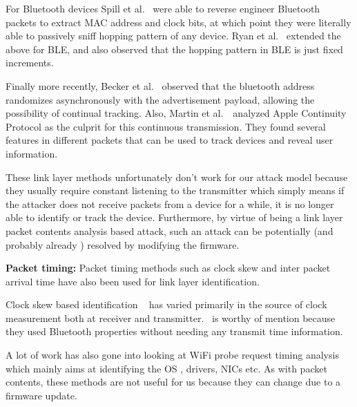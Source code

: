     For Bluetooth devices Spill et al.~\cite{spill2007bluesniff} were able to reverse engineer Bluetooth
    packets to extract MAC address and clock bits, at which point they were literally able to passively sniff hopping pattern of any device.
    Ryan et al.~\cite{ryanble} extended the above for BLE, and also observed that
    the hopping pattern in BLE is just fixed increments.
    
    Finally more recently,
    Becker et al.~\cite{Iphonetracking_becker} observed that the bluetooth address randomizes asynchronously with the
    advertisement payload, allowing the possibility of continual tracking.
    Also, Martin et al.~\cite{MACRandomizationfail_Martin}~analyzed Apple Continuity
    Protocol as the culprit for this continuous transmission. They found several
    features in different packets that can be used to track devices and reveal user
    information.
    
    These link layer methods unfortunately don't work for our attack model because they usually require constant listening to the transmitter which simply means if the attacker does not receive packets from a device for a while, it is no longer able to identify or track the device. Furthermore, by virtue of being a link layer packet contents analysis based attack,
    such an attack can be potentially (and probably already ) resolved by modifying
    the firmware.
    
    \noindent\textbf{Packet timing:}
    Packet timing methods such as clock skew and inter packet arrival time have also been used for link layer identification.
    
    Clock skew based identification ~\cite{clockskew1,clockskew2,clockskew3} has varied primarily in the source of clock measurement both at receiver and transmitter.~\cite{clockskew3} is worthy of mention because they used Bluetooth properties without needing any transmit time information.
    
    A lot of work has also gone into looking at WiFi probe request timing analysis~\cite{ifat1,rateswitching2,devicediscovery1} which mainly aims at identifying the OS , drivers, NICs etc. As with packet contents, these methods are not useful for us because they can change due to a firmware update.
    
